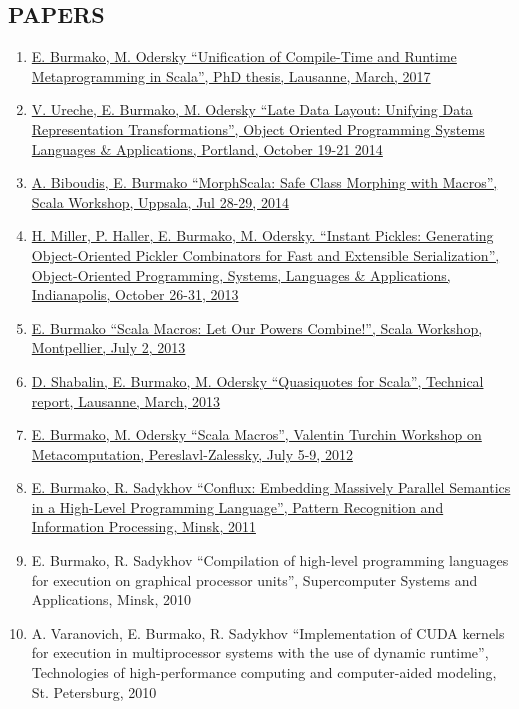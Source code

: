 \documentclass[margin, 10pt]{Stylesheet}
\begin{document}
\begin{resume}
\section{PAPERS}

\begin{enumerate} \itemsep -2pt
\item \href{https://infoscience.epfl.ch/record/226166}{E. Burmako, M. Odersky ``Unification of Compile-Time and Runtime Metaprogramming in Scala'', PhD thesis, Lausanne, March, 2017}
\item \href{https://infoscience.epfl.ch/record/200963}{V. Ureche, E. Burmako, M. Odersky ``Late Data Layout: Unifying Data Representation Transformations'', Object Oriented Programming Systems Languages \& Applications, Portland, October 19-21 2014}
\item \href{http://scalamacros.org/paperstalks/2014-07-29-MorphScala.pdf}{A. Biboudis, E. Burmako ``MorphScala: Safe Class Morphing with Macros'', Scala Workshop, Uppsala, Jul 28-29, 2014}
\item \href{http://infoscience.epfl.ch/record/187787}{H. Miller, P. Haller, E. Burmako, M. Odersky. ``Instant Pickles: Generating Object-Oriented Pickler Combinators for Fast and Extensible Serialization'', Object-Oriented Programming, Systems, Languages \& Applications, Indianapolis, October 26-31, 2013}
\item \href{https://infoscience.epfl.ch/record/186844}{E. Burmako ``Scala Macros: Let Our Powers Combine!'', Scala Workshop, Montpellier, July 2, 2013}
\item \href{https://infoscience.epfl.ch/record/185242}{D. Shabalin, E. Burmako, M. Odersky ``Quasiquotes for Scala'', Technical report, Lausanne, March, 2013}
\item \href{http://infoscience.epfl.ch/record/183862}{E. Burmako, M. Odersky ``Scala Macros'', Valentin Turchin Workshop on Metacomputation, Pereslavl-Zalessky, July 5-9, 2012}
\item \href{https://code.google.com/archive/p/conflux/downloads}{E. Burmako, R. Sadykhov ``Conflux: Embedding Massively Parallel Semantics in a High-Level Programming Language'', Pattern Recognition and Information Processing, Minsk, 2011}
\item E. Burmako, R. Sadykhov ``Compilation of high-level programming languages for execution on graphical processor units'', Supercomputer Systems and Applications, Minsk, 2010
\item A. Varanovich, E. Burmako, R. Sadykhov ``Implementation of CUDA kernels for execution in multiprocessor systems with the use of dynamic runtime'', Technologies of high-performance computing and computer-aided modeling, St. Petersburg, 2010
\end{enumerate}

\end{resume}
\end{document}
